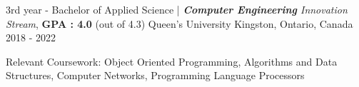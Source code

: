 

\begin{cventries}

  \cventry
    {3rd year - Bachelor of Applied Science | \textit{\textbf{Computer Engineering} Innovation Stream}, \textbf{GPA : 4.0} (out of 4.3)} %
    {Queen's University} %
    {Kingston, Ontario, Canada} %
    { 2018 - 2022} %
    {
    \begin{cvitems} %
        \item {Relevant Coursework: Object Oriented Programming, Algorithms and Data Structures, Computer Networks, Programming Language Processors}
      \end{cvitems}
    }
\end{cventries}